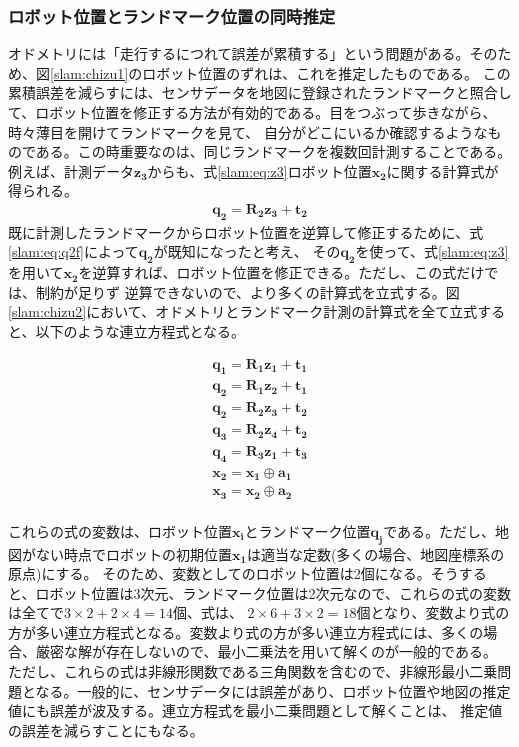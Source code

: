 \subsubsection{ロボット位置とランドマーク位置の同時推定}
オドメトリには「走行するにつれて誤差が累積する」という問題がある。そのため、図\ref{slam:chizu1}のロボット位置のずれは、これを推定したものである。
この累積誤差を減らすには、センサデータを地図に登録されたランドマークと照合して、ロボット位置を修正する方法が有効的である。目をつぶって歩きながら、時々薄目を開けてランドマークを見て、
自分がどこにいるか確認するようなものである。この時重要なのは、同じランドマークを複数回計測することである。例えば、計測データ$\bm{z_3}$からも、式\eqref{slam:eq:z3}ロボット位置$\bm{x_2}$に関する計算式が得られる。
\begin{align}
  \bm{q_2} = \bm{R_2z_3+t_2} \label{slam:eq:z3}
\end{align}
既に計測したランドマークからロボット位置を逆算して修正するために、式\eqref{slam:eq:q2f}によって$\bm{q_2}$が既知になったと考え、
その$\bm{q_2}$を使って、式\eqref{slam:eq:z3}を用いて$\bm{x_2}$を逆算すれば、ロボット位置を修正できる。ただし、この式だけでは、制約が足りず
逆算できないので、より多くの計算式を立式する。図\ref{slam:chizu2}において、オドメトリとランドマーク計測の計算式を全て立式すると、以下のような連立方程式となる。

\begin{align*}
  \bm{q_1} = \bm{R_1z_1+t_1}\\
  \bm{q_2} = \bm{R_1z_2+t_1}\\
  \bm{q_2} = \bm{R_2z_3+t_2}\\
  \bm{q_3} = \bm{R_2z_4+t_2}\\
  \bm{q_4} = \bm{R_3z_1+t_3}\\
  \bm{x_2} = \bm{x_1\oplus a_1}\\
  \bm{x_3} = \bm{x_2\oplus a_2}\\
\end{align*}

これらの式の変数は、ロボット位置$\bm{x_i}$とランドマーク位置$\bm{q_j}$である。ただし、地図がない時点でロボットの初期位置$\bm{x_1}$は適当な定数(多くの場合、地図座標系の原点)にする。
そのため、変数としてのロボット位置は2個になる。そうすると、ロボット位置は3次元、ランドマーク位置は2次元なので、これらの式の変数は全てで$3\times 2+2\times 4 = 14$個、式は、
$2\times 6+3\times 2=18$個となり、変数より式の方が多い連立方程式となる。変数より式の方が多い連立方程式には、多くの場合、厳密な解が存在しないので、最小二乗法を用いて解くのが一般的である。
ただし、これらの式は非線形関数である三角関数を含むので、非線形最小二乗問題となる。一般的に、センサデータには誤差があり、ロボット位置や地図の推定値にも誤差が波及する。連立方程式を最小二乗問題として解くことは、
推定値の誤差を減らすことにもなる。


